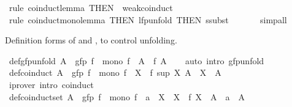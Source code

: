 \begin{isabellebody}
\isamarkupfalse%
\ {\isacharparenleft}{\kern0pt}rule\ coinduct{}{\isacharunderscore}{\kern0pt}lemma\ {\isacharbrackleft}{\kern0pt}THEN\ {\isacharbrackleft}{\kern0pt}{}{\isacharbrackright}{\kern0pt}\ weak{\isacharunderscore}{\kern0pt}coinduct{\isacharbrackright}{\kern0pt}{\isacharparenright}{\kern0pt}\isanewline
\ \ \ \ \isamarkupfalse%
\ {\isacharparenleft}{\kern0pt}rule\ coinduct{}{\isacharunderscore}{\kern0pt}mono{\isacharunderscore}{\kern0pt}lemma\ {\isacharbrackleft}{\kern0pt}THEN\ lfp{\isacharunderscore}{\kern0pt}unfold{\isacharcomma}{\kern0pt}\ THEN\ ssubst{\isacharbrackright}{\kern0pt}{\isacharparenright}{\kern0pt}\isanewline
\ \ \ \ \ \isamarkupfalse%
\ simp{\isacharunderscore}{\kern0pt}all\isanewline
\ \ \isamarkupfalse%
%
\endisatagproof
{\isafoldproof}%
%
\isadelimproof
%
\endisadelimproof
%
\begin{isamarkuptext}%
Definition forms of  and , to control unfolding.%
\end{isamarkuptext}\isamarkuptrue%
\isamarkupfalse%
\ def{\isacharunderscore}{\kern0pt}gfp{\isacharunderscore}{\kern0pt}unfold{\isacharcolon}{\kern0pt}\ {\isachardoublequoteopen}A\ {\isasymequiv}\ gfp\ f\ {\isasymLongrightarrow}\ mono\ f\ {\isasymLongrightarrow}\ A\ {\isacharequal}{\kern0pt}\ f\ A{\isachardoublequoteclose}\isanewline
%
\isadelimproof
\ \ %
\endisadelimproof
%
\isatagproof
{}\isamarkupfalse%
\ {\isacharparenleft}{\kern0pt}auto\ intro{\isacharbang}{\kern0pt}{\isacharcolon}{\kern0pt}\ gfp{\isacharunderscore}{\kern0pt}unfold{\isacharparenright}{\kern0pt}%
\endisatagproof
{\isafoldproof}%
%
\isadelimproof
\isanewline
%
\endisadelimproof
\isanewline
{}\isamarkupfalse%
\ def{\isacharunderscore}{\kern0pt}coinduct{\isacharcolon}{\kern0pt}\ {\isachardoublequoteopen}A\ {\isasymequiv}\ gfp\ f\ {\isasymLongrightarrow}\ mono\ f\ {\isasymLongrightarrow}\ X\ {\isasymle}\ f\ {\isacharparenleft}{\kern0pt}sup\ X\ A{\isacharparenright}{\kern0pt}\ {\isasymLongrightarrow}\ X\ {\isasymle}\ A{\isachardoublequoteclose}\isanewline
%
\isadelimproof
\ \ %
\endisadelimproof
%
\isatagproof
{}\isamarkupfalse%
\ {\isacharparenleft}{\kern0pt}iprover\ intro{\isacharbang}{\kern0pt}{\isacharcolon}{\kern0pt}\ coinduct{\isacharparenright}{\kern0pt}%
\endisatagproof
{\isafoldproof}%
%
\isadelimproof
\isanewline
%
\endisadelimproof
\isanewline
{}\isamarkupfalse%
\ def{\isacharunderscore}{\kern0pt}coinduct{\isacharunderscore}{\kern0pt}set{\isacharcolon}{\kern0pt}\ {\isachardoublequoteopen}A\ {\isasymequiv}\ gfp\ f\ {\isasymLongrightarrow}\ mono\ f\ {\isasymLongrightarrow}\ a\ {\isasymin}\ X\ {\isasymLongrightarrow}\ X\ {\isasymsubseteq}\ f\ {\isacharparenleft}{\kern0pt}X\ {\isasymunion}\ A{\isacharparenright}{\kern0pt}\ {\isasymLongrightarrow}\ a\ {\isasymin}\ A{\isachardoublequoteclose}\isanewline

\end{isabellebody}
